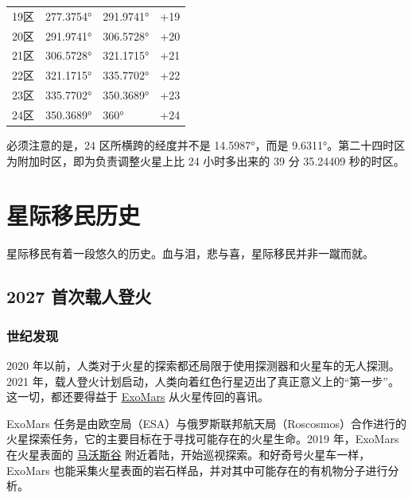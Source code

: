 \documentclass[letterpaper,10pt]{sphinxmanual}
\begin{document}
\begin{threeparttable}
\begin{tabulary}{\linewidth}{|L|L|L|L|}
19区
 & 
277.3754°
 & 
291.9741°
 & 
+19
\\

20区
 & 
291.9741°
 & 
306.5728°
 & 
+20
\\

21区
 & 
306.5728°
 & 
321.1715°
 & 
+21
\\

22区
 & 
321.1715°
 & 
335.7702°
 & 
+22
\\

23区
 & 
335.7702°
 & 
350.3689°
 & 
+23
\\

24区
 & 
350.3689°
 & 
360°
 & 
+24
\\
\hline\end{tabulary}

\end{threeparttable}


必须注意的是，24 区所横跨的经度并不是 14.5987°，而是 9.6311°。第二十四时区为附加时区，即为负责调整火星上比 24 小时多出来的 39 分 35.24409 秒的时区。


\section{星际移民历史}
\label{history::doc}\label{history:id1}
星际移民有着一段悠久的历史。血与泪，悲与喜，星际移民并非一蹴而就。


\subsection{2027 首次载人登火}
\label{history:id2}

\subsubsection{世纪发现}
\label{history:id3}
2020 年以前，人类对于火星的探索都还局限于使用探测器和火星车的无人探测。2021 年，载人登火计划启动，人类向着红色行星迈出了真正意义上的“第一步”。这一切，都还要得益于 \href{http://en.wikipedia.org/wiki/ExoMars}{ExoMars} 从火星传回的喜讯。

ExoMars 任务是由欧空局（ESA）与俄罗斯联邦航天局（Roscosmos）合作进行的火星探索任务，它的主要目标在于寻找可能存在的火星生命。2019 年，ExoMars 在火星表面的 \href{http://en.wikipedia.org/wiki/Mawrth\_Vallis}{马沃斯谷} 附近着陆，开始巡视探索。和好奇号火星车一样，ExoMars 也能采集火星表面的岩石样品，并对其中可能存在的有机物分子进行分析。
\begin{figure}[htbp]
\centering
\end{figure}
\end{document}
